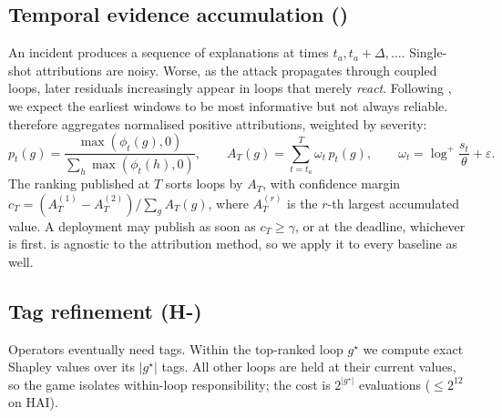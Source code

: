 \subsection{Temporal evidence accumulation (\TEA)}
An incident produces a sequence of explanations at times $t_a,t_a+\Delta,\dots$. Single-shot attributions are noisy. Worse, as the attack propagates through coupled loops, later residuals increasingly appear in loops that merely \emph{react}. Following \citet{fung2024attributions}, we expect the earliest windows to be most informative but not always reliable. \TEA{} therefore aggregates normalised positive attributions, weighted by severity:
\begin{equation}\label{eq:tea}
p_t(g)=\frac{\max(\phi_t(g),0)}{\sum_h\max(\phi_t(h),0)},\qquad A_T(g)=\sum_{t=t_a}^{T}\omega_t\,p_t(g),\qquad \omega_t=\log^+\!\frac{s_t}{\theta}+\varepsilon .
\end{equation}
The ranking published at $T$ sorts loops by $A_T$, with confidence margin $c_T=(A_T^{(1)}-A_T^{(2)})/\sum_g A_T(g)$, where $A_T^{(r)}$ is the $r$-th largest accumulated value. A deployment may publish as soon as $c_T\ge\gamma$, or at the deadline, whichever is first. \TEA{} is agnostic to the attribution method, so we apply it to every baseline as well.

\subsection{Tag refinement (H-\LX)}
Operators eventually need tags. Within the top-ranked loop $g^\star$ we compute exact Shapley values over its $|g^\star|$ tags. All other loops are held at their current values, so the game isolates within-loop responsibility; the cost is $2^{|g^\star|}$ evaluations ($\le 2^{12}$ on HAI).

